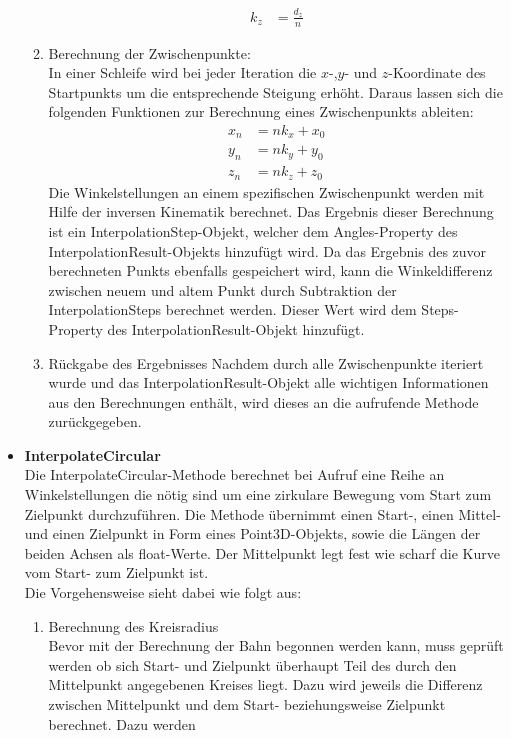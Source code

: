 \begin{itemize}
\begin{enumerate}
\begin{align*}
k_z & = \frac{d_z}{n}
\end{align*}
\item Berechnung der Zwischenpunkte:\\
In einer Schleife wird bei jeder Iteration die $x$-,$y$- und $z$-Koordinate des Startpunkts um die entsprechende Steigung erhöht. Daraus lassen sich die folgenden Funktionen zur Berechnung eines Zwischenpunkts ableiten:
\begin{align*}
x_n & = n k_x + x_0\\
y_n & =  n k_y + y_0\\
z_n & = n k_z + z_0 
\end{align*}
Die Winkelstellungen an einem spezifischen Zwischenpunkt werden mit Hilfe der inversen Kinematik berechnet. Das Ergebnis dieser Berechnung ist ein InterpolationStep-Objekt, welcher dem Angles-Property des InterpolationResult-Objekts hinzufügt wird. Da das Ergebnis des zuvor berechneten Punkts ebenfalls gespeichert wird, kann die Winkeldifferenz zwischen neuem und altem Punkt durch Subtraktion der InterpolationSteps berechnet werden. Dieser Wert wird dem Steps-Property des InterpolationResult-Objekt hinzufügt.
\item Rückgabe des Ergebnisses
Nachdem durch alle Zwischenpunkte iteriert wurde und das InterpolationResult-Objekt alle wichtigen Informationen aus den Berechnungen enthält, wird dieses an die aufrufende Methode zurückgegeben.
\end{enumerate}
\item \textbf{InterpolateCircular}\\
Die InterpolateCircular-Methode berechnet bei Aufruf eine Reihe an Winkelstellungen die nötig sind um eine zirkulare Bewegung vom Start zum Zielpunkt durchzuführen. Die Methode übernimmt einen Start-, einen Mittel- und einen Zielpunkt in Form eines Point3D-Objekts, sowie die Längen der beiden Achsen als float-Werte. Der Mittelpunkt legt fest wie scharf die Kurve vom Start- zum Zielpunkt ist.\\
Die Vorgehensweise sieht dabei wie folgt aus:
\begin{enumerate}
\item Berechnung des Kreisradius\\
Bevor mit der Berechnung der Bahn begonnen werden kann, muss geprüft werden ob sich Start- und Zielpunkt überhaupt Teil des durch den Mittelpunkt angegebenen Kreises liegt. Dazu wird jeweils die Differenz zwischen Mittelpunkt und dem Start- beziehungsweise Zielpunkt berechnet. Dazu werden\\

\end{enumerate}
\end{itemize}
